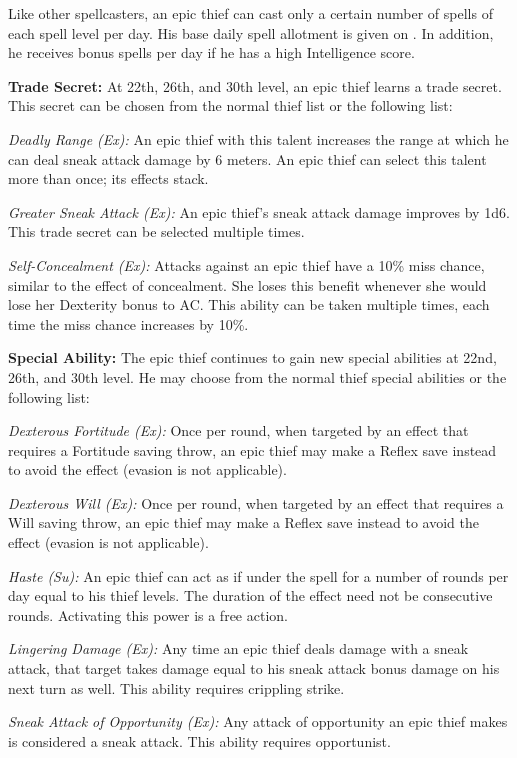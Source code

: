 Like other spellcasters, an epic thief can cast only a certain number of spells of each spell level per day. His base daily spell allotment is given on . In addition, he receives bonus spells per day if he has a high Intelligence score.

\textbf{Trade Secret:} At 22th, 26th, and 30th level, an epic thief learns a trade secret. This secret can be chosen from the normal thief list or the following list:

\textit{Deadly Range (Ex):} An epic thief with this talent increases the range at which he can deal sneak attack damage by 6 meters. An epic thief can select this talent more than once; its effects stack.

\textit{Greater Sneak Attack (Ex):} An epic thief's sneak attack damage improves by 1d6. This trade secret can be selected multiple times.

\textit{Self-Concealment (Ex):} Attacks against an epic thief have a 10\% miss chance, similar to the effect of concealment. She loses this benefit whenever she would lose her Dexterity bonus to AC. This ability can be taken multiple times, each time the miss chance increases by 10\%.


\textbf{Special Ability:} The epic thief continues to gain new special abilities at 22nd, 26th, and 30th level. He may choose from the normal thief special abilities or the following list:

\textit{Dexterous Fortitude (Ex):} Once per round, when targeted by an effect that requires a Fortitude saving throw, an epic thief may make a Reflex save instead to avoid the effect (evasion is not applicable).

\textit{Dexterous Will (Ex):} Once per round, when targeted by an effect that requires a Will saving throw, an epic thief may make a Reflex save instead to avoid the effect (evasion is not applicable).

\textit{Haste (Su):} An epic thief can act as if under the  spell for a number of rounds per day equal to \onefifth his thief levels. The duration of the effect need not be consecutive rounds. Activating this power is a free action.

\textit{Lingering Damage (Ex):} Any time an epic thief deals damage with a sneak attack, that target takes damage equal to his sneak attack bonus damage on his next turn as well. This ability requires crippling strike.

\textit{Sneak Attack of Opportunity (Ex):} Any attack of opportunity an epic thief makes is considered a sneak attack. This ability requires opportunist.


